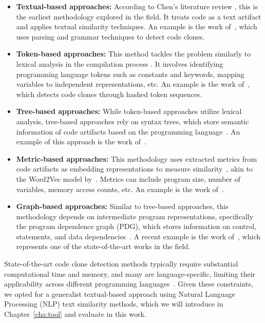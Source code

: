 \begin{itemize}
    \item \textbf{Textual-based approaches:} According to Chen’s literature 
    review \citep{litreview}, this is the earliest methodology explored in 
    the field. It treats code as a text artifact and applies textual similarity
    techniques. An example is the work of~\cite{textexample}, 
    which uses parsing and grammar techniques to detect code clones.

    \item \textbf{Token-based approaches:} This method tackles the problem 
    similarly to lexical analysis in the compilation process \citep{litreview}. 
    It involves identifying programming language tokens such as constants and 
    keywords, mapping variables to independent representations, etc. An example
    is the work of~\cite{tokenexample}, which detects code 
    clones through hashed token sequences.

    \item \textbf{Tree-based approaches:} While token-based approaches utilize
     lexical analysis, tree-based approaches rely on syntax trees, which store
     semantic information of code artifacts based on the programming
     language~\citep{compiler}. An example of this approach is the work of~\cite{treeexample}.

    \item \textbf{Metric-based approaches:} This methodology uses extracted 
    metrics from code artifacts as embedding representations to measure 
    similarity~\citep{litreview}, akin to the Word2Vec model by~\cite{wordtovec}.
    Metrics can include program size, number of variables, 
    memory access counts, etc. An example is the work of~\cite{metricexample}.

    \item \textbf{Graph-based approaches:} Similar to tree-based approaches, 
    this methodology depends on intermediate program representations, 
    specifically the program dependence graph (PDG), which stores information 
    on control, statements, and data dependencies~\citep{prodg}. A recent 
    example is the work of~\cite{tailor}, which represents one of 
    the state-of-the-art works in the field.
\end{itemize}

State-of-the-art code clone detection methods typically require substantial
computational time and memory, and many are language-specific, limiting their
applicability across different programming languages~\citep{litreview}. Given
these constraints, we opted for a generalist textual-based approach using
Natural Language Processing (NLP) text similarity methods, which we will
introduce in Chapter~\ref{cha:tool} and evaluate in this work.

